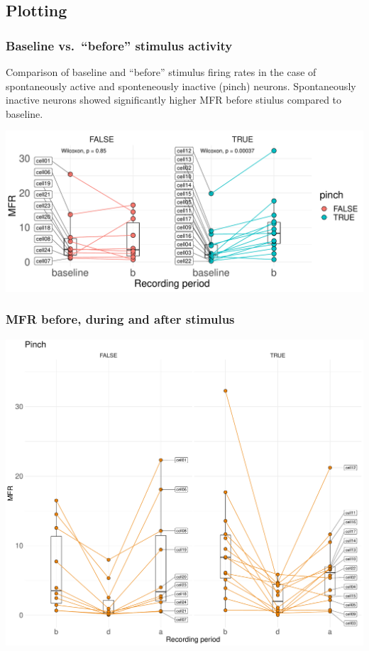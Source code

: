 \documentclass[12pt,]{article}
\begin{document}
\hypertarget{htmlwidget-1636ee18d6f8dcbb26ca}{}

\hypertarget{plotting}{%
\subsection{Plotting}\label{plotting}}

\hypertarget{baseline-vs.-before-stimulus-activity}{%
\subsubsection{Baseline vs.~``before'' stimulus
activity}\label{baseline-vs.-before-stimulus-activity}}

Comparison of baseline and ``before'' stimulus firing rates in the case
of spontaneously active and sponteneously inactive (pinch) neurons.
Spontaneously inactive neurons showed significantly higher MFR before
stiulus compared to baseline.

\includegraphics{GII_analysis_notebook_files/figure-latex/unnamed-chunk-13-1.pdf}

\hypertarget{mfr-before-during-and-after-stimulus}{%
\subsubsection{MFR before, during and after
stimulus}\label{mfr-before-during-and-after-stimulus}}

\includegraphics{GII_analysis_notebook_files/figure-latex/unnamed-chunk-14-1.pdf}
\end{document}
